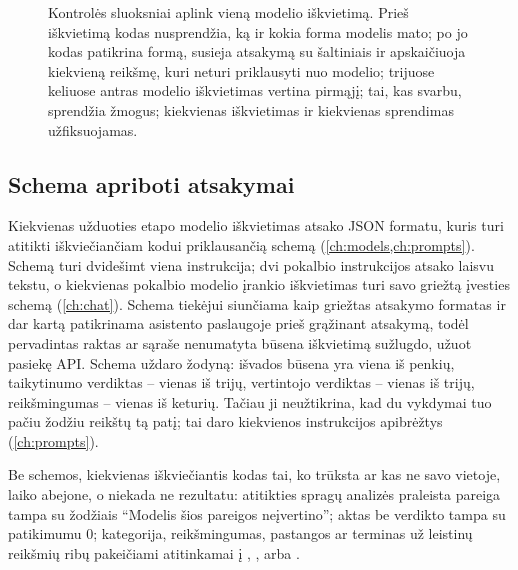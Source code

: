 \begin{figure}[H]
\actorlegend
\caption{Kontrolės sluoksniai aplink vieną modelio iškvietimą. Prieš iškvietimą kodas
nusprendžia, ką ir kokia forma modelis mato; po jo kodas patikrina formą, susieja atsakymą su
šaltiniais ir apskaičiuoja kiekvieną reikšmę, kuri neturi priklausyti nuo modelio; trijuose
keliuose antras modelio iškvietimas vertina pirmąjį; tai, kas svarbu, sprendžia žmogus;
kiekvienas iškvietimas ir kiekvienas sprendimas užfiksuojamas.}\label{fig:control:layers}
\end{figure}

\subsection{Schema apriboti atsakymai}\label{sec:control:schema}

Kiekvienas užduoties etapo modelio iškvietimas atsako JSON formatu, kuris turi atitikti
iškviečiančiam kodui priklausančią schemą (\cref{ch:models,ch:prompts}). Schemą turi
dvidešimt viena instrukcija; dvi pokalbio instrukcijos atsako laisvu tekstu, o kiekvienas
pokalbio modelio įrankio iškvietimas turi savo griežtą įvesties schemą (\cref{ch:chat}).
Schema tiekėjui siunčiama kaip griežtas atsakymo formatas ir dar kartą patikrinama asistento
paslaugoje prieš grąžinant atsakymą, todėl pervadintas raktas ar sąraše nenumatyta būsena
iškvietimą sužlugdo, užuot pasiekę API. Schema uždaro žodyną: išvados būsena yra viena iš
penkių, taikytinumo verdiktas -- vienas iš trijų, vertintojo verdiktas -- vienas iš trijų,
reikšmingumas -- vienas iš keturių. Tačiau ji neužtikrina, kad du vykdymai tuo pačiu žodžiu
reikštų tą patį; tai daro kiekvienos instrukcijos apibrėžtys (\cref{ch:prompts}).

Be schemos, kiekvienas iškviečiantis kodas tai, ko trūksta ar kas ne savo vietoje, laiko
abejone, o niekada ne rezultatu: atitikties spragų analizės praleista pareiga tampa
 su žodžiais \enquote{Modelis šios pareigos neįvertino}; aktas be verdikto
tampa  su patikimumu 0; kategorija, reikšmingumas, pastangos ar terminas už
leistinų reikšmių ribų pakeičiami atitinkamai į , , 
arba .

